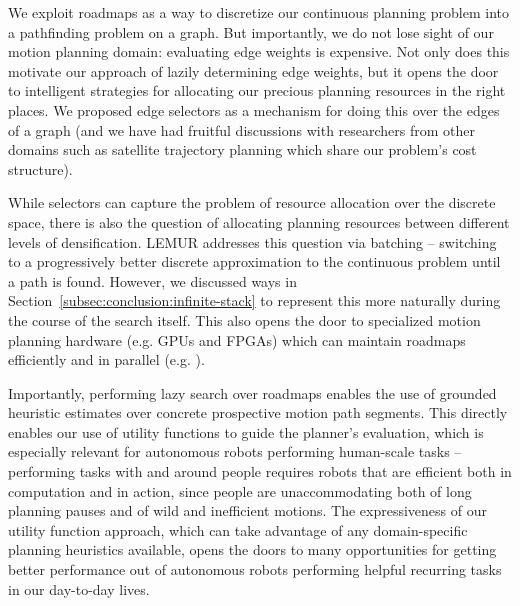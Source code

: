 We exploit roadmaps as a way to discretize our continuous planning
problem into a pathfinding problem on a graph.
But importantly, we do not lose sight of our motion planning domain:
evaluating edge weights is expensive.
Not only does this motivate our approach of lazily determining edge
weights,
but it opens the door to intelligent strategies for allocating our
precious planning resources in the right places.
We proposed edge selectors as a mechanism for doing this over the
edges of a graph
(and we have had fruitful discussions with researchers from other
domains such as satellite trajectory planning
which share our problem's cost structure).

While selectors can capture the problem of resource allocation
over the discrete space,
there is also the question of allocating planning resources between
different levels of densification.
LEMUR addresses this question via batching -- switching to a
progressively better discrete approximation to the continuous problem
until a path is found.
However, we discussed ways in Section~\ref{subsec:conclusion:infinite-stack}
to represent this more naturally during the course of the search itself.
This also opens the door to specialized motion planning hardware
(e.g. GPUs and FPGAs) which can maintain roadmaps efficiently
and in parallel (e.g. \citep{murray2016onachip}).

Importantly,
performing lazy search over roadmaps enables the use of grounded
heuristic estimates over concrete prospective motion path segments.
This directly enables our use of utility functions to guide the planner's
evaluation,
which is especially relevant for autonomous robots performing
human-scale tasks
-- performing tasks with and around people requires robots
that are efficient both in computation and in action,
since people are unaccommodating both of long planning pauses
and of wild and inefficient motions.
The expressiveness of our utility function approach,
which can take advantage of any domain-specific planning heuristics
available,
opens the doors to many opportunities for getting better performance
out of autonomous robots performing helpful recurring tasks in our
day-to-day lives.

